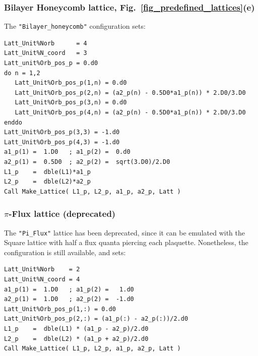 \subsubsection{Bilayer Honeycomb lattice, Fig.~\ref{fig_predefined_lattices}(e)}
The \texttt{"Bilayer\_honeycomb"} configuration sets:
\begin{lstlisting}[style=fortran]
Latt_Unit%Norb      = 4
Latt_Unit%N_coord   = 3
Latt_unit%Orb_pos_p = 0.d0
do n = 1,2
   Latt_Unit%Orb_pos_p(1,n) = 0.d0 
   Latt_Unit%Orb_pos_p(2,n) = (a2_p(n) - 0.5D0*a1_p(n)) * 2.D0/3.D0
   Latt_Unit%Orb_pos_p(3,n) = 0.d0 
   Latt_Unit%Orb_pos_p(4,n) = (a2_p(n) - 0.5D0*a1_p(n)) * 2.D0/3.D0
enddo
Latt_Unit%Orb_pos_p(3,3) = -1.d0
Latt_Unit%Orb_pos_p(4,3) = -1.d0
a1_p(1) =  1.D0   ; a1_p(2) =  0.d0
a2_p(1) =  0.5D0  ; a2_p(2) =  sqrt(3.D0)/2.D0
L1_p    =  dble(L1)*a1_p
L2_p    =  dble(L2)*a2_p
Call Make_Lattice( L1_p, L2_p, a1_p, a2_p, Latt )
\end{lstlisting}


\subsubsection{$\pi$-Flux lattice (deprecated)}

The \texttt{"Pi\_Flux"} lattice has been deprecated, since it can be emulated with the Square lattice with half a flux quanta piercing each plaquette. Nonetheless, the configuration is still available, and sets:
\begin{lstlisting}[style=fortran]
Latt_Unit%Norb    = 2
Latt_Unit%N_coord = 4
a1_p(1) =  1.D0   ; a1_p(2) =   1.d0
a2_p(1) =  1.D0   ; a2_p(2) =  -1.d0
Latt_Unit%Orb_pos_p(1,:) = 0.d0 
Latt_Unit%Orb_pos_p(2,:) = (a1_p(:) - a2_p(:))/2.d0 
L1_p    =  dble(L1) * (a1_p - a2_p)/2.d0
L2_p    =  dble(L2) * (a1_p + a2_p)/2.d0
Call Make_Lattice( L1_p, L2_p, a1_p, a2_p, Latt )
\end{lstlisting}


